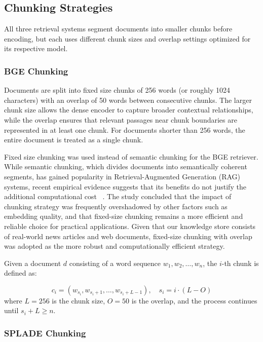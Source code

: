 \subsection{Chunking Strategies}

All three retrieval systems segment documents into smaller chunks before encoding, but each uses different chunk sizes and overlap settings optimized for its respective model.

\subsubsection{BGE Chunking}

Documents are split into fixed size chunks of 256 words (or roughly 1024 characters) with an overlap of 50 words between consecutive chunks. The larger chunk size allows the dense encoder to capture broader contextual relationships, while the overlap ensures that relevant passages near chunk boundaries are represented in at least one chunk. For documents shorter than 256 words, the entire document is treated as a single chunk.

Fixed size chunking was used instead of semantic chunking for the BGE retriever. While semantic chunking, which divides documents into semantically coherent segments, has gained popularity in Retrieval-Augmented Generation (RAG) systems, recent empirical evidence suggests that its benefits do not justify the additional computational cost ~\cite{Qu2024Oct}. The study concluded that the impact of chunking strategy was frequently overshadowed by other factors such as embedding quality, and that fixed-size chunking remains a more efficient and reliable choice for practical applications. Given that our knowledge store consists of real-world news articles and web documents, fixed-size chunking with overlap was adopted as the more robust and computationally efficient strategy.

Given a document $d$ consisting of a word sequence $w_1, w_2, \ldots, w_n$, the $i$-th chunk is defined as:

\begin{equation}
    c_i = (w_{s_i}, w_{s_i+1}, \ldots, w_{s_i + L - 1}), \quad s_i = i \cdot (L - O)
\end{equation}
where $L = 256$ is the chunk size, $O = 50$ is the overlap, and the process continues until $s_i + L \geq n$.

\subsubsection{SPLADE Chunking}

